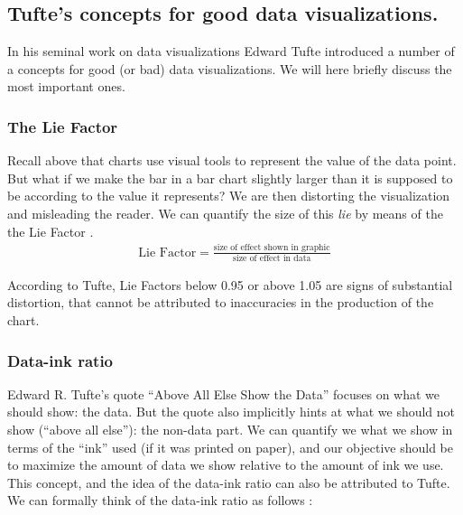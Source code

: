\documentclass[]{book}
\begin{document}
\hypertarget{tuftes-concepts-for-good-data-visualizations.}{%
\subsection{Tufte's concepts for good data visualizations.}\label{tuftes-concepts-for-good-data-visualizations.}}

In his seminal work on data visualizations Edward Tufte introduced a number of a concepts for good (or bad) data visualizations. We will here briefly discuss the most important ones.

\hypertarget{the-lie-factor}{%
\subsubsection{The Lie Factor}\label{the-lie-factor}}

Recall above that charts use visual tools to represent the value of the data point. But what if we make the bar in a bar chart slightly larger than it is supposed to be according to the value it represents? We are then distorting the visualization and misleading the reader. We can quantify the size of this \emph{lie} by means of the the Lie Factor \citep[p.~57 in][]{tufte2001visual}.
\begin{align}
    \text{Lie Factor}=\frac{\text{size of effect shown in graphic}}{\text{size of effect in data}}
\end{align}

According to Tufte, Lie Factors below 0.95 or above 1.05 are signs of substantial distortion, that cannot be attributed to inaccuracies in the production of the chart.

\hypertarget{data-ink-ratio}{%
\subsubsection{Data-ink ratio}\label{data-ink-ratio}}

Edward R. Tufte's quote ``Above All Else Show the Data'' \citep{tufte2001visual} focuses on what we should show: the data. But the quote also implicitly hints at what we should not show (``above all else''): the non-data part. We can quantify we what we show in terms of the ``ink'' used (if it was printed on paper), and our objective should be to maximize the amount of data we show relative to the amount of ink we use. This concept, and the idea of the data-ink ratio can also be attributed to Tufte. We can formally think of the data-ink ratio as follows \citep{tufte2001visual}:
\end{document}
